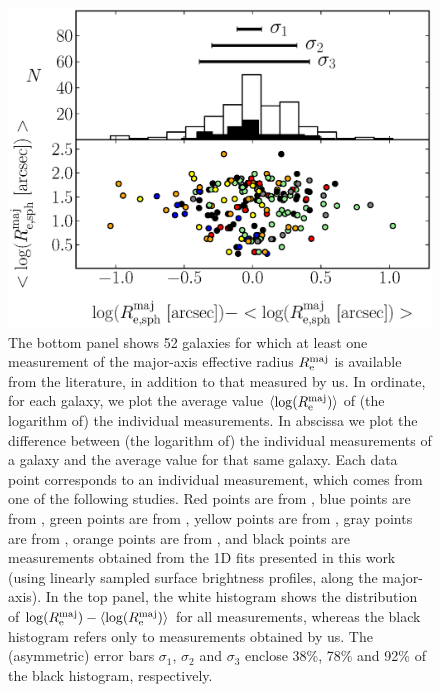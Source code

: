 \documentclass[preprint2]{emulateapj}
\begin{document}
\begin{figure}%
\begin{center}
\includegraphics[width=1.1\columnwidth]{images/comparison_all_r_e.eps} 
\caption{The bottom panel shows 52 galaxies for which at least one measurement 
of the major-axis effective radius $R_{\rm e}^{\rm maj}$ is available 
from the literature, in addition to that measured by us.
In ordinate, for each galaxy, we plot the average value $\langle \log(R_{\rm e}^{\rm maj}) \rangle$ 
of (the logarithm of) the individual measurements. 
In abscissa we plot the difference between (the logarithm of) the individual measurements of a galaxy 
and the average value for that same galaxy.
Each data point corresponds to an individual measurement, 
which comes from one of the following studies. 
Red points are from \cite{grahamdriver2007}, 
blue points are from \cite{laurikainen2010}, green points are from \cite{sani2011}, 
yellow points are from \cite{vika2012}, gray points are from \cite{beifiori2012},
orange points are from \cite{lasker2014data},
and black points are measurements obtained from the 1D fits presented in this work 
(using linearly sampled surface brightness profiles, along the major-axis).
In the top panel, the white histogram shows the distribution of $\log(R_{\rm e}^{\rm maj}) - \langle \log(R_{\rm e}^{\rm maj}) \rangle$ 
for all measurements, 
whereas the black histogram refers only to measurements obtained by us.
The (asymmetric) error bars $\sigma_1$, $\sigma_2$ and $\sigma_3$ enclose 38\%, 78\% and 92\% 
of the black histogram, respectively.}
\label{fig:compre}
\end{center}
\end{figure}
\end{document}
